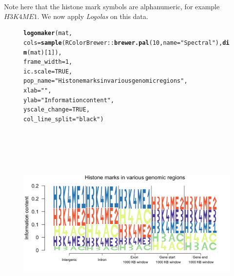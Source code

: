 \documentclass[12pt]{article}\usepackage[]{graphicx}\usepackage[usenames,dvipsnames]{color}
\makeatletter
\newcommand{\hlnum}[1]{\textcolor[rgb]{0.686,0.059,0.569}{#1}}%
\newcommand{\hlstr}[1]{\textcolor[rgb]{0.192,0.494,0.8}{#1}}%
\newcommand{\hlopt}[1]{\textcolor[rgb]{0,0,0}{#1}}%
\newcommand{\hlstd}[1]{\textcolor[rgb]{0.345,0.345,0.345}{#1}}%
\newcommand{\hlkwc}[1]{\textcolor[rgb]{0.333,0.667,0.333}{#1}}%
\newcommand{\hlkwd}[1]{\textcolor[rgb]{0.737,0.353,0.396}{\textbf{#1}}}%
\newenvironment{kframe}{%
 \def\at@end@of@kframe{}%
 \ifinner\ifhmode%
  \def\at@end@of@kframe{\end{minipage}}%
  \begin{minipage}{\columnwidth}%
 \fi\fi%
 \def\FrameCommand##1{\hskip\@totalleftmargin \hskip-\fboxsep
 \colorbox{shadecolor}{##1}\hskip-\fboxsep
     \hskip-\linewidth \hskip-\@totalleftmargin \hskip\columnwidth}%
 \MakeFramed {\advance\hsize-\width
   \@totalleftmargin\z@ \linewidth\hsize
   \@setminipage}}%
 {\par\unskip\endMakeFramed%
 \at@end@of@kframe}
\newenvironment{knitrout}{}{} %
\newcommand{\Logolas}{\textit{Logolas}}
\makeatother
\begin{document}
Note here that the histone mark symbols are alphanumeric, for example $H3K4ME1$.
We now apply \Logolas{} on this data.

\begin{figure}[h]
\begin{center}
\begin{knitrout}
\color{fgcolor}\begin{kframe}
\begin{alltt}
\hlkwd{logomaker}\hlstd{(mat,}
          \hlkwc{cols}\hlstd{=} \hlkwd{sample}\hlstd{(RColorBrewer}\hlopt{::}\hlkwd{brewer.pal}\hlstd{(}\hlnum{10}\hlstd{,}\hlkwc{name} \hlstd{=} \hlstr{"Spectral"}\hlstd{),} \hlkwd{dim}\hlstd{(mat)[}\hlnum{1}\hlstd{]),}
          \hlkwc{frame_width} \hlstd{=} \hlnum{1}\hlstd{,}
          \hlkwc{ic.scale} \hlstd{=} \hlnum{TRUE}\hlstd{,}
          \hlkwc{pop_name} \hlstd{=} \hlstr{"Histone marks in various genomic regions"}\hlstd{,}
          \hlkwc{xlab} \hlstd{=} \hlstr{""}\hlstd{,}
          \hlkwc{ylab} \hlstd{=} \hlstr{"Information content"}\hlstd{,}
          \hlkwc{yscale_change} \hlstd{=} \hlnum{TRUE}\hlstd{,}
          \hlkwc{col_line_split} \hlstd{=} \hlstr{"black"}\hlstd{)}
\end{alltt}
\end{kframe}
\includegraphics[width=8.5in,height=4in]{figure/logolas_use_9-1} 

\end{knitrout}
\end{center}
\end{figure}

\newpage
\end{document}
